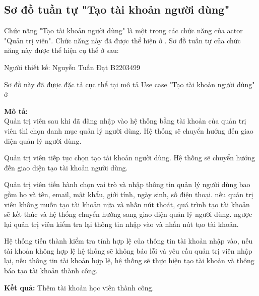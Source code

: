 \subsection{Sơ đồ tuần tự "Tạo tài khoản người dùng"}
\setcounter{figure}{0}

Chức năng "Tạo tài khoản người dùng" là một trong các chức năng của actor "Quản trị viên".
Chức năng này đã được thể hiện ở .
Sơ đồ tuần tự của chức năng này được thể hiện cụ thể ở \myref{} sau:

Người thiết kế: Nguyễn Tuấn Đạt B2203499

Sơ đồ này đã được đặc tả cục thể tại mô tả Use case
"Tạo tài khoản người dùng" ở 

\noindent
\textbf{Mô tả:}\\
Quản trị viên sau khi đã đăng nhập vào hệ thống bằng tài khoản của quản trị viên thì chọn danh mục quản lý người dùng. Hệ thống sẽ chuyển hướng đến giao diện quản lý người dùng. \par
Quản trị viên tiếp tục chọn tạo tài khoản người dùng. Hệ thống sẽ chuyển hướng đến giao diện tạo tài khoản người dùng. \par
Quản trị viên tiến hành chọn vai trò và nhập thông tin quản lý người dùng bao gồm họ và tên, email, mật khẩu, giới tính, ngày sinh, số điện thoại. nếu quản trị viên không muốn tạo tài khoản nữa và nhấn nút thoát, quá trình tạo tài khoản sẽ kết thúc và hệ thống chuyển hướng sang giao diện quản lý người dùng. ngược lại quản trị viên kiểm tra lại thông tin nhập vào và nhấn nút tạo tài khoản. \par
Hệ thống tiến thành kiểm tra tính hợp lệ của thông tin tài khoản nhập vào, nếu tài khoản không hợp lệ hệ thống sẽ không báo lỗi và yêu cầu quản trị viên nhập lại, nếu thông tin tài khoản hợp lệ, hệ thống sẽ thực hiện tạo tài khoản và thông báo tạo tài khoản thành công.

\noindent
\textbf{Kết quả:} Thêm tài khoản học viên thành công.


